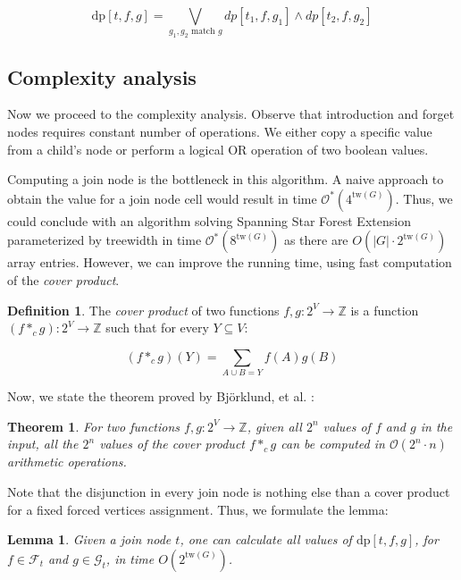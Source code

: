 \documentclass[en]{pracamgr}
\newtheorem{theorem}{Theorem}
\newtheorem{lemma}{Lemma}
\theoremstyle{definition}
\newtheorem{definition}{Definition}
\newcommand{\ssfep}{{\sc Spanning Star Forest Extension}}
\newcommand{\dpt}[1]{\textrm{dp}[#1]}
\newcommand{\tw}{\textrm{tw}}
\begin{document}
\begin{equation*}
	\dpt{t,f,g} =
		\bigvee\limits_{g_1,g_2 \text{ match $g$}} dp[t_1,f,g_1] \land dp[t_2,f,g_2]
\end{equation*}

\subsection{Complexity analysis}

Now we proceed to the complexity analysis. Observe that introduction and forget nodes requires constant number of operations. We either copy a specific value from a child's node or perform a logical OR operation of two boolean values. 

Computing a join node is the bottleneck in this algorithm. A naive approach to obtain the value for a join node cell would result in time $\mathcal{O}^*(4^{\tw(G)})$. Thus, we could conclude with an algorithm solving \ssfep{} parameterized by treewidth in time $\mathcal{O}^*(8^{\tw(G)})$ as there are $O(|G| \cdot 2^{\tw(G)})$ array entries. However, we can improve the running time, using fast computation of the \textit{cover product}.

\begin{definition}
	The \textit{cover product} of two functions $f,g:2^V \rightarrow \mathbb{Z}$ is a function $(f *_c g):2^V \rightarrow \mathbb{Z}$ such that for every $Y \subseteq V$:
	
	\begin{equation*}
		(f *_c g)(Y) = \sum\limits_{ A \cup B = Y} f(A)g(B)
	\end{equation*}
\end{definition}

Now, we state the theorem proved by Björklund, et al. \cite{CoverProduct}:

\begin{theorem}\label{cproduct}
	For two functions $f,g:2^V \rightarrow \mathbb{Z}$, given all $2^n$ values of $f$ and $g$ in the input, all the $2^n$ values of the cover product $f*_cg$ can be computed in $\mathcal{O}(2^n\cdot n)$ arithmetic operations.
\end{theorem}

Note that the disjunction in every join node is nothing else than a cover product for a fixed forced vertices assignment. Thus, we formulate the lemma:

\begin{lemma}\label{join lemma}
	Given a join node $t$, one can calculate all values of $\dpt{t,f,g}$, for $f \in \mathcal{F}_t$ and $g \in \mathcal{G}_t$, in time $O(2^{\tw(G)})$.
\end{lemma}
\end{document}

